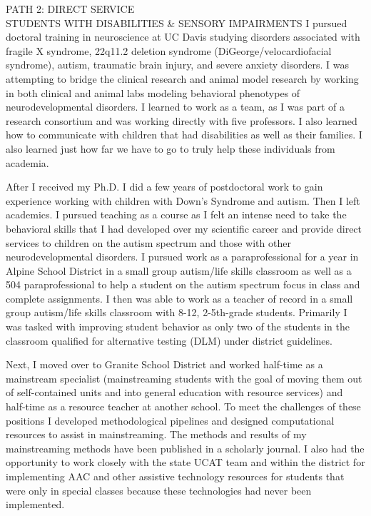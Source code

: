 \documentclass{resume} %
\begin{document}
\begin{rSection}{PATH 2: DIRECT SERVICE\\STUDENTS WITH DISABILITIES \& SENSORY IMPAIRMENTS}
I pursued doctoral training in neuroscience at UC Davis studying disorders associated with fragile X syndrome, 22q11.2 deletion syndrome (DiGeorge/velocardiofacial syndrome), autism, traumatic brain injury, and severe anxiety disorders. I was attempting to bridge the clinical research and animal model research by working in both clinical and animal labs modeling behavioral phenotypes of neurodevelopmental disorders. I learned to work as a team, as I was part of a research consortium and was working directly with five professors. I also learned how to communicate with children that had disabilities as well as their families. I also learned just how far we have to go to truly help these individuals from academia. 

After I received my Ph.D. I did a few years of postdoctoral work to gain experience working with children with Down’s Syndrome and autism. Then I left academics. I pursued teaching as a course as I felt an intense need to take the behavioral skills that I had developed over my scientific career and provide direct services to children on the autism spectrum and those with other neurodevelopmental disorders. I pursued work as a paraprofessional for a year in Alpine School District in a small group autism/life skills classroom as well as a 504 paraprofessional to help a student on the autism spectrum focus in class and complete assignments. I then was able to work as a teacher of record in a small group autism/life skills classroom with 8-12, 2-5th-grade students. Primarily I was tasked with improving student behavior as only two of the students in the classroom qualified for alternative testing (DLM) under district guidelines. 

Next, I moved over to Granite School District and worked half-time as a mainstream specialist (mainstreaming students with the goal of moving them out of self-contained units and into general education with resource services) and half-time as a resource teacher at another school. To meet the challenges of these positions I developed methodological pipelines and designed computational resources to assist in mainstreaming. The methods and results of my mainstreaming methods have been published in a scholarly journal. I also had the opportunity to work closely with the state UCAT team and within the district for implementing AAC and other assistive technology resources for students that were only in special classes because these technologies had never been implemented. 


\end{rSection}
\end{document}
